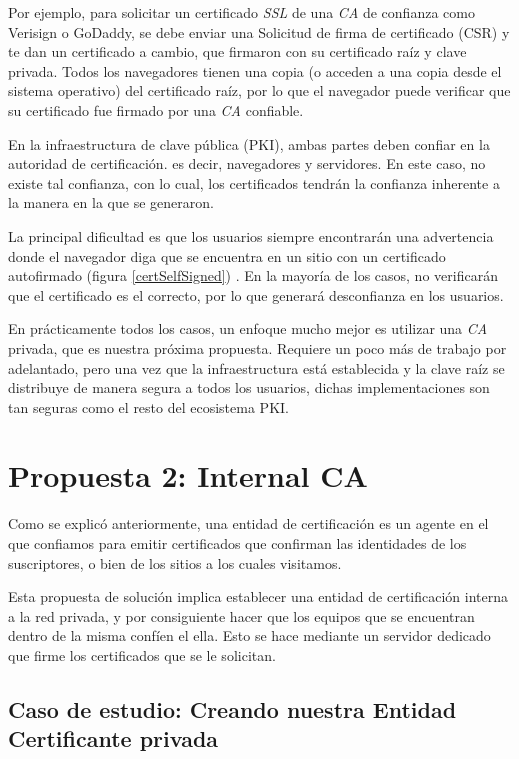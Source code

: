 Por ejemplo, para solicitar un certificado \emph{SSL} de una \emph{CA} de confianza como Verisign o 
GoDaddy, se debe enviar una Solicitud de firma de certificado (CSR) y te dan un 
certificado a cambio, que firmaron con su certificado raíz y clave privada. Todos 
los navegadores tienen una copia (o acceden a una copia desde el sistema operativo) 
del certificado raíz, por lo que el navegador puede verificar que su certificado 
fue firmado por una \emph{CA} confiable.

En la infraestructura de clave pública (PKI), ambas partes deben confiar en la autoridad 
de certificación. es decir, navegadores y servidores. En este caso, no existe tal confianza, 
con lo cual, los certificados tendrán la confianza inherente a la manera en la que se generaron.

La principal dificultad es que los usuarios siempre encontrarán una advertencia 
donde el navegador diga que se encuentra en un sitio con un certificado autofirmado (figura \ref{certSelfSigned}) . 
En la mayoría de los casos, no verificarán que el certificado es el correcto, por 
lo que generará desconfianza en los usuarios.

En prácticamente todos los casos, un enfoque mucho mejor es utilizar una \emph{CA} privada, 
que es nuestra próxima propuesta. Requiere un poco más de trabajo por adelantado, 
pero una vez que la infraestructura está establecida y la clave raíz se distribuye 
de manera segura a todos los usuarios, dichas implementaciones son tan seguras como 
el resto del ecosistema PKI.

\section{Propuesta 2: Internal CA}

Como se explicó anteriormente, una entidad de certificación es un agente en el que 
confiamos para emitir 
certificados que confirman las identidades de los suscriptores, o bien de los 
sitios a los cuales visitamos. 

Esta propuesta de solución implica establecer una entidad de certificación interna 
a la red privada, y por consiguiente hacer que los equipos que se encuentran 
dentro de la misma confíen el ella. Esto se hace 
mediante un servidor dedicado que firme los certificados que se le solicitan.




\subsection{Caso de estudio: Creando nuestra Entidad Certificante privada}



